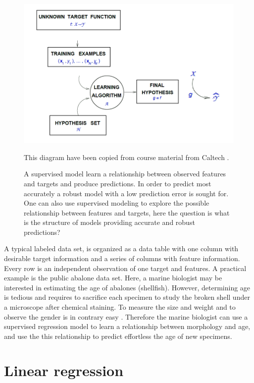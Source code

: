 \begin{figure}[!htbp]
\includegraphics[width=\textwidth,height=\textheight,keepaspectratio]{graphics/sketchMLmapping.png}
\caption{A supervised model learn a relationship between observed features and targets and produce predictions. In order to predict most accurately a robust model with a low prediction error is sought for. One can also use supervised modeling to explore the possible relationship between features and targets, here the question is what is the structure of models providing accurate and robust predictions?} This diagram have been copied from course material from Caltech \cite{Mostafa13learning}.
\label{modelPreditExplain}
\end{figure}

A typical labeled data set, is organized as a data table with one column with desirable target information and a series of columns with feature information. Every row is an independent observation of one target and features. A practical example is the public abalone data set. Here, a marine biologist may be interested in estimating the age of abalones (shellfish). However, determining age is tedious and requires to sacrifice each specimen to study the broken shell under a microscope after chemical staining. To measure the size and weight and to observe the gender is in contrary easy \cite{lichman2013uci}. Therefore the marine biologist can use a supervised regression model to learn a relationship between morphology and age, and use the this relationship to predict effortless the age of new specimens.

\section{Linear regression}

